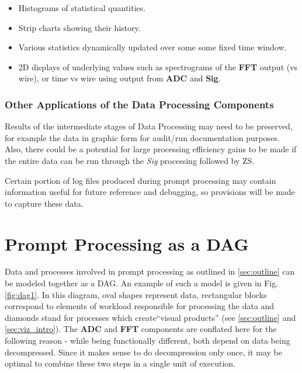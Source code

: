 \documentclass[pdftex,12pt,letter]{article}
\begin{document}
\begin{itemize}

\item Histograms of statistical quantities.

\item Strip charts showing their history.

\item Various statistics dynamically updated over some some fixed time window.

\item 2D displays of underlying values such as spectrograms of the \textbf{FFT}
  output (vs wire), or time vs wire using output from \textbf{ADC} and \textbf{Sig}.

\end{itemize}

\subsubsection{Other Applications of the Data Processing Components}
Results of the intermediate stages of Data Processing may need to be preserved, for
example the data in graphic form for audit/run documentation purposes.
Also, there could be a potential for large processing efficiency
gains to be made if the entire data can be run through the \textit{Sig} processing followed by ZS.

Certain portion of log files produced during prompt processing may contain information useful
for future reference and debugging, so provisions will be made to capture these data.


\section{Prompt Processing as a DAG}
\label{sec:dag}
Data and processes involved in prompt processing as outlined in \ref{sec:outline} can be
modeled together as a DAG. An example of such a model is given in Fig.\ref{fig:dag1}.
In this diagram, oval shapes represent data, rectangular blocks correspond to
elements of workload responsible for processing the data and diamonds stand for processes
which create``visual products'' (see \ref{sec:outline} and \ref{sec:viz_intro}).
The \textbf{ADC} and \textbf{FFT} components are conflated here for the following reason - while being functionally
different, both depend on data being decompressed. Since it makes sense to do decompression only once, it may
be optimal to combine these two steps in a single unit of execution.
\end{document}

